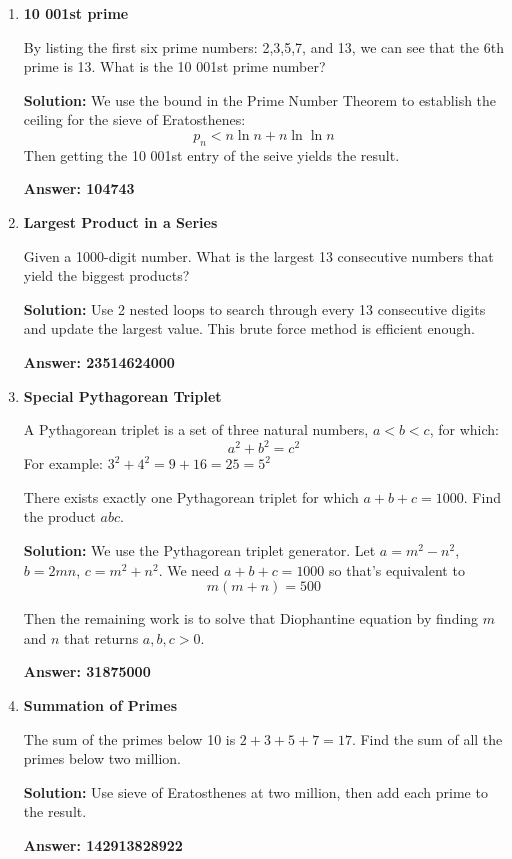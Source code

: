 \documentclass[12pt]{article}
\begin{document}
\begin{enumerate}
    \item \textbf{10 001st prime}
    \par By listing the first six prime numbers: 2,3,5,7, and 13, we can see that the 6th prime is 13. What is the 10 001st prime number?

    \par \textbf{Solution:} We use the bound in the Prime Number Theorem to establish the ceiling for the sieve of Eratosthenes:
    \begin{equation*}
        p_n < n \ln n + n \ln \ln n
    \end{equation*}
    Then getting the 10 001st entry of the seive yields the result.
    \par \textbf{Answer: 104743}

    \item \textbf{Largest Product in a Series}
    \par Given a 1000-digit number. What is the largest 13 consecutive numbers that yield the biggest products?
    \par \textbf{Solution:} Use 2 nested loops to search through every 13 consecutive digits and update the largest value. This brute force method is efficient enough.
    \par \textbf{Answer: 23514624000}

    \item \textbf{Special Pythagorean Triplet}
    \par A Pythagorean triplet is a set of three natural numbers, $a < b<c$, for which:
    $$ a^2 + b^2 = c^2$$
    For example: $3^2 + 4^2 = 9+16 = 25 = 5^2$
    \par There exists exactly one Pythagorean triplet for which $a + b + c  =1000$. Find the product $abc$.

    \par \textbf{Solution:} We use the Pythagorean triplet generator. Let $a = m^2 - n^2$, $b = 2mn$, $c = m^2 + n^2$. We need $a + b + c = 1000$ so that's equivalent to $$m(m+n) = 500$$
    \par Then the remaining work is to solve that Diophantine equation by finding $m$ and $n$ that returns $a,b,c > 0$.
    \par \textbf{Answer: 31875000}

    \item \textbf{Summation of Primes}
    \par The sum of the primes below 10 is $2+3+5+7=17$. Find the sum of all the primes below two million.
    \par \textbf{Solution:} Use sieve of Eratosthenes at two million, then add each prime to the result. 
    \par \textbf{Answer: 142913828922}


\end{enumerate}
\end{document}
